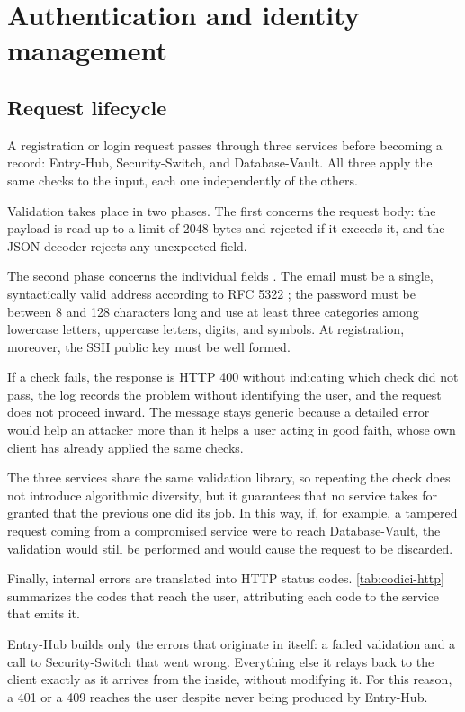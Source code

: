 \chapter{Authentication and identity management}
\label{chap:autenticazione}

\section{Request lifecycle}
\label{sec:ciclo-richiesta}

A registration or login request passes through three services before becoming a record:
Entry-Hub, Security-Switch, and Database-Vault. All three apply the same checks to the input,
each one independently of the others.

Validation takes place in two phases. The first concerns the request body: the payload is
read up to a limit of 2048 bytes and rejected if it exceeds it, and the JSON decoder rejects any unexpected field.

The second phase concerns the individual fields \cite{ramusb-code-eh-f-04}. The email must be a
single, syntactically valid address according to RFC 5322 \cite{rfc5322}; the password must be
between 8 and 128 characters long and use at least three categories among lowercase letters, uppercase letters, digits, and symbols.
At registration, moreover, the SSH public key must be well formed.

If a check fails, the response is HTTP 400 without indicating which check did not pass, the
log records the problem without identifying the user, and the request does not proceed inward.
The message stays generic because a detailed error would help an attacker more than it helps a
user acting in good faith, whose own client has already applied the same checks.

The three services share the same validation library, so repeating the check does not
introduce algorithmic diversity, but it guarantees that no service takes for granted that the
previous one did its job. In this way, if, for example, a tampered request coming from a
compromised service were to reach Database-Vault, the validation would still be performed and would cause the request to be discarded.

Finally, internal errors are translated into HTTP status codes. \autoref{tab:codici-http} summarizes the codes
that reach the user, attributing each code to the service that emits it.

Entry-Hub builds only the errors that originate in itself: a failed validation and a
call to Security-Switch that went wrong. Everything else it relays back to the client exactly as it arrives
from the inside, without modifying it. For this reason, a 401 or a 409 reaches the user despite never
being produced by Entry-Hub.

